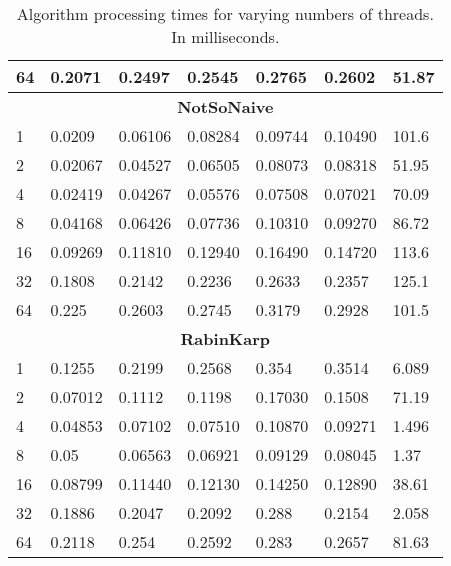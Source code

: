 \documentclass[11pt]{article}
\begin{document}
\begin{table}[]
{\begin{tabular}{@{}lllllll@{}}
64 & 0.2071 & 0.2497 & 0.2545 & 0.2765 & 0.2602 & 51.87 \\ \midrule
\multicolumn{7}{|c|}{\textbf{NotSoNaive}} \\ \midrule
1 & 0.0209 & 0.06106 & 0.08284 & 0.09744 & 0.10490 & 101.6 \\
2 & 0.02067 & 0.04527 & 0.06505 & 0.08073 & 0.08318 & 51.95 \\
4 & 0.02419 & 0.04267 & 0.05576 & 0.07508 & 0.07021 & 70.09 \\
8 & 0.04168 & 0.06426 & 0.07736 & 0.10310 & 0.09270 & 86.72 \\
16 & 0.09269 & 0.11810 & 0.12940 & 0.16490 & 0.14720 & 113.6 \\
32 & 0.1808 & 0.2142 & 0.2236 & 0.2633 & 0.2357 & 125.1 \\
64 & 0.225 & 0.2603 & 0.2745 & 0.3179 & 0.2928 & 101.5 \\ \midrule
\multicolumn{7}{|c|}{\textbf{RabinKarp}} \\ \midrule
1 & 0.1255 & 0.2199 & 0.2568 & 0.354 & 0.3514 & 6.089 \\
2 & 0.07012 & 0.1112 & 0.1198 & 0.17030 & 0.1508 & 71.19 \\
4 & 0.04853 & 0.07102 & 0.07510 & 0.10870 & 0.09271 & 1.496 \\
8 & 0.05 & 0.06563 & 0.06921 & 0.09129 & 0.08045 & 1.37 \\
16 & 0.08799 & 0.11440 & 0.12130 & 0.14250 & 0.12890 & 38.61 \\
32 & 0.1886 & 0.2047 & 0.2092 & 0.288 & 0.2154 & 2.058 \\
64 & 0.2118 & 0.254 & 0.2592 & 0.283 & 0.2657 & 81.63 \\ \bottomrule
\end{tabular}}
\caption{Algorithm processing times for varying numbers of threads. In milliseconds.}
\label{table-algorithmsdifferentthreads}
\end{table}



\end{document}
